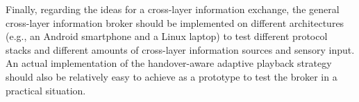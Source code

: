 Finally, regarding the ideas for a cross-layer information exchange, the general cross-layer information broker should be implemented on different architectures (e.g., an Android smartphone and a Linux laptop) to test different protocol stacks and different amounts of cross-layer information sources and sensory input. An actual implementation of the handover-aware adaptive playback strategy should also be relatively easy to achieve as a prototype to test the broker in a practical situation.




